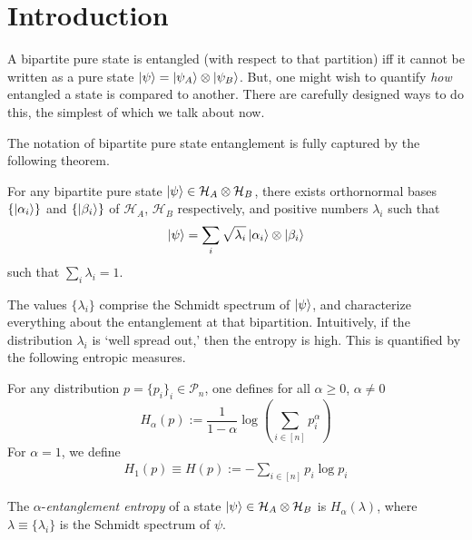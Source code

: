 \section{Introduction}
A bipartite pure state is entangled (with respect to that partition) iff it cannot be written as a pure state $\ket{\psi} = \ket{\psi_A}\otimes\ket{\psi_B}$. But, one might wish to quantify \textit{how} entangled a state is compared to another. There are carefully designed ways to do this, the simplest of which we talk about now. 


The notation of bipartite pure state entanglement is fully captured by the following theorem.
\begin{theorem}
    For any bipartite pure state $\ket{\psi} \in \mathcal{H}_A\otimes\mathcal{H}_B$, there exists orthornormal bases $\{\ket{\alpha_i}\}$ and $\{\ket{\beta_i}\}$ of $\mathcal{H}_A$, $\mathcal{H}_B$ respectively, and positive numbers $\lambda_i$ such that 
    \begin{equation}
        \ket{\psi} = \sum_{i} \sqrt{\lambda_i} \ket{\alpha_i} \otimes \ket{\beta_i}
    \end{equation}
    such that $\sum_i\lambda_i = 1$.
\end{theorem}
The values $\{\lambda_i\}$ comprise the Schmidt spectrum of $\ket{\psi}$, and characterize everything about the entanglement at that bipartition. Intuitively, if the distribution $\lambda_i$ is `well spread out,' then the entropy is high. This is quantified by the following entropic measures.

\begin{definition}
    For any distribution $p = \{p_i\}_i \in \mathcal{P}_n$, one defines for all $\alpha \geq 0$, $\alpha \neq 0$
    \begin{equation}
        H_\alpha(p) := \frac{1}{1-\alpha}\log\left(\sum_{i\in[n]}p_i^\alpha\right)
    \end{equation}
    For $\alpha = 1$, we define 
    \begin{eqnarray}
        H_1(p) \equiv H(p) := -\sum_{i\in[n]}p_i \log{p_i}
    \end{eqnarray}
\end{definition}
The $\alpha$-\textit{entanglement entropy} of a state $\ket{\psi} \in \mathcal{H}_A\otimes\mathcal{H}_B$ is $H_\alpha(\lambda)$, where $\lambda \equiv \{\lambda_i\}$ is the Schmidt spectrum of $\psi$.


